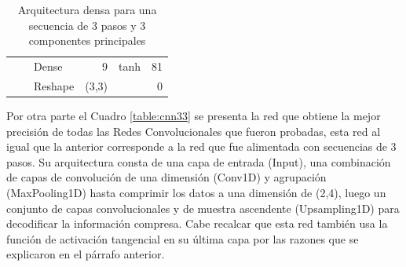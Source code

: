 \begin{table}[H]
\begin{center}
\begin{tabular}{ll|l|r|l|r|}
\multicolumn{1}{|l|}{}                              &                             & Dense                              & 9                                    & tanh                                     & 81                                          \\ \cline{3-6} 
\multicolumn{1}{|l|}{}                              &                             & Reshape                            & (3,3)                                &                                          & 0                                           \\ \hline
\end{tabular}
\end{center}
\caption{Arquitectura densa para una secuencia de 3 pasos y 3 componentes principales}
\label{table:dense33}
\end{table}




Por otra parte el Cuadro \ref{table:cnn33} se presenta la red que obtiene la mejor precisi\'{o}n de todas las Redes Convolucionales que fueron probadas, esta red al igual que la anterior corresponde a la red que fue alimentada con secuencias de 3 pasos. Su arquitectura consta de una capa de entrada (Input), una combinaci\'{o}n de capas de convoluci\'{o}n de una dimensi\'{o}n (Conv1D) y agrupaci\'{o}n (MaxPooling1D) hasta comprimir los datos a una dimensi\'{o}n de (2,4), luego un conjunto de capas convolucionales y de muestra ascendente (Upsampling1D) para decodificar la informaci\'{o}n compresa. Cabe recalcar que esta red tambi\'{e}n usa la funci\'{o}n de activaci\'{o}n tangencial en su \'{u}ltima capa por las razones que se explicaron en el p\'{a}rrafo anterior.


